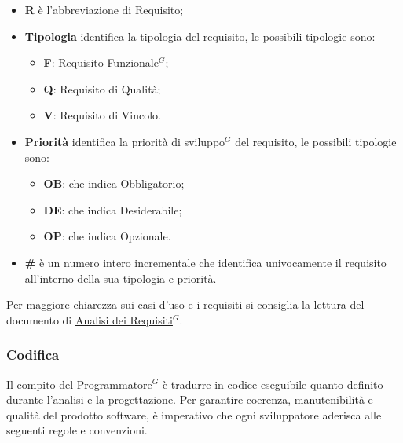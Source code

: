 		\begin{itemize}
			\item \textbf{R} è l'abbreviazione di Requisito;
			\item \textbf{Tipologia} identifica la tipologia del requisito, le possibili tipologie sono:
				\begin{itemize}[itemsep=3pt, parsep=1pt, label=$\scriptstyle\bullet$]
					\item \textbf{F}: Requisito Funzionale$^G$;
					\item \textbf{Q}: Requisito di Qualità;
					\item \textbf{V}: Requisito di Vincolo.
				\end{itemize}
			\item \textbf{Priorità} identifica la priorità di sviluppo$^G$ del requisito, le possibili tipologie sono:
				\begin{itemize}[itemsep=3pt, parsep=1pt, label=$\scriptstyle\bullet$]
					\item \textbf{OB}: che indica Obbligatorio;
					\item \textbf{DE}: che indica Desiderabile;
					\item \textbf{OP}: che indica Opzionale.
				\end{itemize}
			\item \textbf{\#} è un numero intero incrementale che identifica univocamente il requisito all’interno della sua tipologia e priorità.
		\end{itemize}
		Per maggiore chiarezza sui casi d’uso e i requisiti si consiglia la lettura del documento di \href{https://nullpointersgroup.github.io/Documentazione/output/PB/Documenti%20Esterni/Analisi_dei_Requisiti.pdf}{Analisi dei Requisiti$^G$}.
	
	\subsubsection{Codifica}
	Il compito del Programmatore$^G$ è tradurre in codice eseguibile quanto definito durante l'analisi e la progettazione. Per garantire coerenza, manutenibilità e qualità del prodotto software, è imperativo che ogni sviluppatore aderisca alle seguenti regole e convenzioni.

